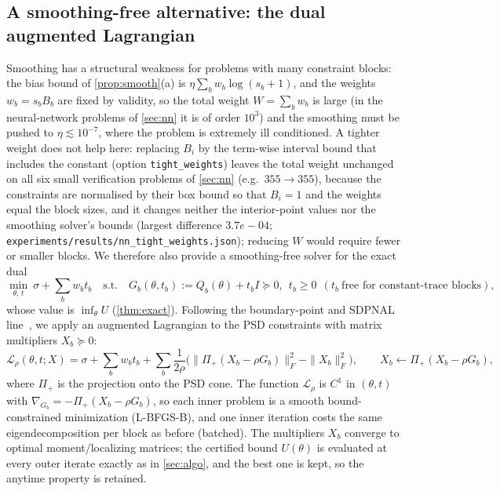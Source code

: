 \documentclass[a4paper,11pt]{article}
\theoremstyle{plain}
\theoremstyle{definition}
\theoremstyle{remark}
\begin{document}
\subsection{A smoothing-free alternative: the dual augmented Lagrangian}\label{sec:alm}
Smoothing has a structural weakness for problems with many constraint blocks: the bias bound of \cref{prop:smooth}(a) is $\eta\sum_bw_b\log(s_b+1)$, and the weights $w_b=s_bB_b$ are fixed by validity, so the total weight $W=\sum_bw_b$ is large (in the neural-network problems of \cref{sec:nn} it is of order $10^3$) and the smoothing must be pushed to $\eta\lesssim10^{-7}$, where the problem is extremely ill conditioned. A tighter weight does not help here: replacing $B_i$ by the term-wise interval bound that includes the constant (option \texttt{tight\_weights}) leaves the total weight unchanged on all six small verification problems of \cref{sec:nn} (e.g.\ $355\to355$), because the constraints are normalised by their box bound so that $B_i=1$ and the weights equal the block sizes, and it changes neither the interior-point values nor the smoothing solver's bounds (largest difference $3.7e-04$; \texttt{experiments/results/nn\_tight\_weights.json}); reducing $W$ would require fewer or smaller blocks. We therefore also provide a smoothing-free solver for the exact dual
\begin{equation}\label{eq:dualsdp}
\min_{\theta,\,t}\ \sigma+\sum_bw_bt_b\quad\text{s.t.}\quad G_b(\theta,t_b):=Q_b(\theta)+t_bI\succeq0,\ \ t_b\ge0\ \ (t_b\ \text{free for constant-trace blocks}),
\end{equation}
whose value is $\inf_\theta U$ (\cref{thm:exact}). Following the boundary-point and SDPNAL line~\cite{povh2006,malick2009,zhao2010}, we apply an augmented Lagrangian to the PSD constraints with matrix multipliers $X_b\succeq0$:
\[
\mathcal L_\rho(\theta,t;X)=\sigma+\sum_bw_bt_b+\sum_b\frac1{2\rho}\Big(\big\|\Pi_+(X_b-\rho G_b)\big\|_F^2-\|X_b\|_F^2\Big),\qquad X_b\leftarrow\Pi_+(X_b-\rho G_b),
\]
where $\Pi_+$ is the projection onto the PSD cone. The function $\mathcal L_\rho$ is $C^1$ in $(\theta,t)$ with $\nabla_{G_b}=-\Pi_+(X_b-\rho G_b)$, so each inner problem is a smooth bound-constrained minimization (L-BFGS-B), and one inner iteration costs the same eigendecomposition per block as before (batched). The multipliers $X_b$ converge to optimal moment/localizing matrices; the certified bound $U(\theta)$ is evaluated at every outer iterate exactly as in \cref{sec:algo}, and the best one is kept, so the anytime property is retained.
\end{document}
